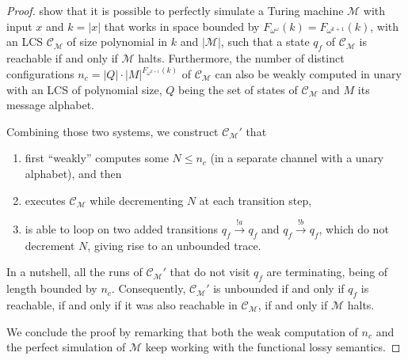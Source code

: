\documentclass[11pt,reqno,a4paper]{amsart}
\newcommand{\ru}[1]{\xrightarrow{#1}}
\theoremstyle{plain}
\theoremstyle{definition}
\theoremstyle{remark}
\begin{document}
\begin{proof}
   show that it is possible to perfectly simulate a
  Turing machine $\mathcal{M}$ with input $x$ and $k=|x|$ that works
  in space bounded by $F_{\omega^\omega}(k)=F_{\omega^{k+1}}(k)$, with an
  LCS $\mathcal{C}_\mathcal{M}$ of size polynomial in $k$ and
  $|\mathcal{M}|$, such that a state $q_f$ of
  $\mathcal{C}_{\mathcal{M}}$ is reachable if and only if
  $\mathcal{M}$ halts.  Furthermore, the number of distinct
  configurations $n_c=|Q|\cdot|M|^{F_{\omega^{k+1}}(k)}$ of
  $\mathcal{C}_\mathcal{M}$ can also be weakly computed in unary with
  an LCS of polynomial size, $Q$ being the set of states of
  $\mathcal{C}_\mathcal{M}$ and $M$ its message alphabet.

  Combining those two systems, we construct $\mathcal{C}_\mathcal{M}'$
  that
  \begin{enumerate}
  \item first ``weakly'' computes some $N\leq n_c$ (in a separate channel
    with a unary alphabet), and then
  \item executes $\mathcal{C}_\mathcal{M}$ while decrementing $N$ at
  each transition step, 
  \item is able to loop on two added transitions $q_f\ru{!a}q_f$ and
  $q_f\ru{!b}q_f$, which do not decrement $N$, giving rise to an
  unbounded trace.
  \end{enumerate}
  In a nutshell, all the runs of $\mathcal{C}_\mathcal{M}'$ that do not
  visit $q_f$ are terminating, being of length bounded by $n_c$.
  Consequently, $\mathcal{C}_\mathcal{M}'$ is unbounded if and only
  if $q_f$ is reachable, if and only if it was also reachable in
  $\mathcal{C}_\mathcal{M}$, if and only if $\mathcal{M}$ halts.

  We conclude the proof by remarking that both the weak computation of
  $n_c$ and the perfect simulation of $\mathcal{M}$ keep working with
  the functional lossy semantics.
\end{proof}
\end{document}
